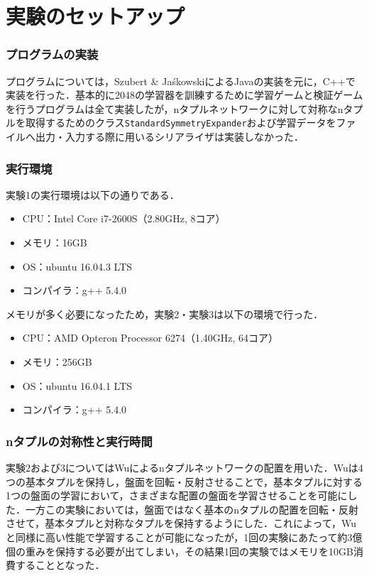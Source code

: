 \documentclass{suribt}
\begin{document}
\section{実験のセットアップ}
\subsubsection{プログラムの実装}
プログラムについては，Szubert \& Ja\'{s}kowskiによるJavaの実装\cite{SzubertInple}を元に，C++で実装を行った．基本的に2048の学習器を訓練するために学習ゲームと検証ゲームを行うプログラムは全て実装したが，nタプルネットワークに対して対称なnタプルを取得するためのクラス\verb|StandardSymmetryExpander|および学習データをファイルへ出力・入力する際に用いるシリアライザは実装しなかった．

\subsubsection{実行環境}
実験1の実行環境は以下の通りである．

\begin{itemize}
\item CPU：Intel Core i7-2600S（2.80GHz, 8コア）
\item メモリ：16GB
\item OS：ubuntu 16.04.3 LTS
\item コンパイラ：g++ 5.4.0
\end{itemize}

メモリが多く必要になったため，実験2・実験3は以下の環境で行った．

\begin{itemize}
\item CPU：AMD Opteron Processor 6274（1.40GHz, 64コア）
\item メモリ：256GB
\item OS：ubuntu 16.04.1 LTS
\item コンパイラ：g++ 5.4.0
\end{itemize}

\subsubsection{nタプルの対称性と実行時間}
実験2および3についてはWuによるnタプルネットワークの配置を用いた．Wuは4つの基本タプルを保持し，盤面を回転・反射させることで，基本タプルに対する1つの盤面の学習において，さまざまな配置の盤面を学習させることを可能にした．一方この実験においては，盤面ではなく基本のnタプルの配置を回転・反射させて，基本タプルと対称なタプルを保持するようにした．これによって，Wuと同様に高い性能で学習することが可能になったが，1回の実験にあたって約3億個の重みを保持する必要が出てしまい，その結果1回の実験ではメモリを10GB消費することとなった．
\end{document}
